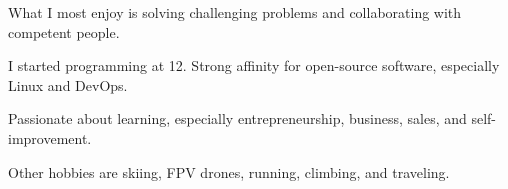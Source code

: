 

\cvlist%
{
	\begin{cvitems} %
		\item {What I most enjoy is solving challenging problems and collaborating with competent people.}
		\item {I started programming at 12. Strong affinity for open-source software, especially Linux and DevOps.}
		\item {Passionate about learning, especially entrepreneurship, business, sales, and self-improvement.}
		\item {Other hobbies are skiing, FPV drones, running, climbing, and traveling.}
	\end{cvitems}
}
